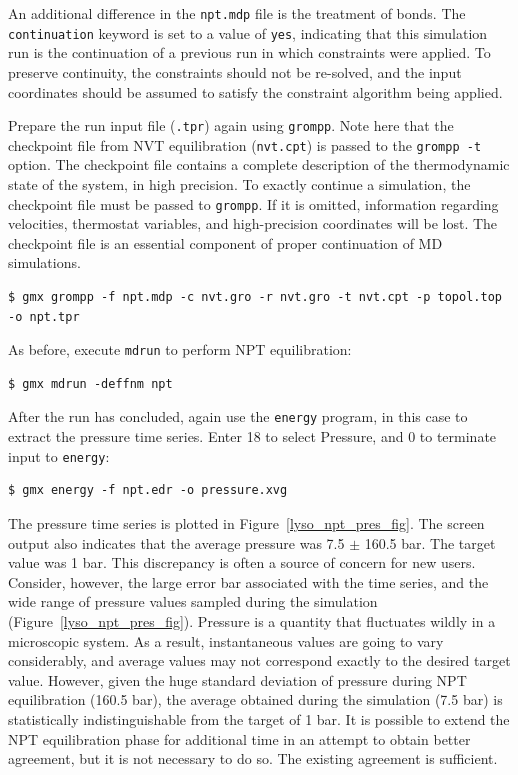 \documentclass[9pt,tutorial,pubversion]{livecoms}
\begin{document}
An additional difference in the \texttt{npt.mdp} file is the treatment of bonds. The \texttt{continuation} keyword is set to a value of \texttt{yes}, indicating that this simulation run is the continuation of a previous run in which constraints were applied. To preserve continuity, the constraints should not be re-solved, and the input coordinates should be assumed to satisfy the constraint algorithm being applied.

Prepare the run input file (\texttt{.tpr}) again using \texttt{grompp}. Note here that the checkpoint file from NVT equilibration (\texttt{nvt.cpt}) is passed to the \texttt{grompp -t} option. The checkpoint file contains a complete description of the thermodynamic state of the system, in high precision. To exactly continue a simulation, the checkpoint file must be passed to \texttt{grompp}. If it is omitted, information regarding velocities, thermostat variables, and high-precision coordinates will be lost. The checkpoint file is an essential component of proper continuation of MD simulations.

\begin{lstlisting}
$ gmx grompp -f npt.mdp -c nvt.gro -r nvt.gro -t nvt.cpt -p topol.top -o npt.tpr
\end{lstlisting}

As before, execute \texttt{mdrun} to perform NPT equilibration:

\begin{lstlisting}
$ gmx mdrun -deffnm npt
\end{lstlisting}

After the run has concluded, again use the \texttt{energy} program, in this case to extract the pressure time series. Enter 18 to select Pressure, and 0 to terminate input to \texttt{energy}:

\begin{lstlisting}
$ gmx energy -f npt.edr -o pressure.xvg
\end{lstlisting}

The pressure time series is plotted in Figure~\ref{lyso_npt_pres_fig}. The screen output also indicates that the average pressure was 7.5 $\pm$ 160.5 bar. The target value was 1 bar. This discrepancy is often a source of concern for new users. Consider, however, the large error bar associated with the time series, and the wide range of pressure values sampled during the simulation (Figure~\ref{lyso_npt_pres_fig}). Pressure is a quantity that fluctuates wildly in a microscopic system. As a result, instantaneous values are going to vary considerably, and average values may not correspond exactly to the desired target value. However, given the huge standard deviation of pressure during NPT equilibration (160.5 bar), the average obtained during the simulation (7.5 bar) is statistically indistinguishable from the target of 1 bar. It is possible to extend the NPT equilibration phase for additional time in an attempt to obtain better agreement, but it is not necessary to do so. The existing agreement is sufficient.
\end{document}
